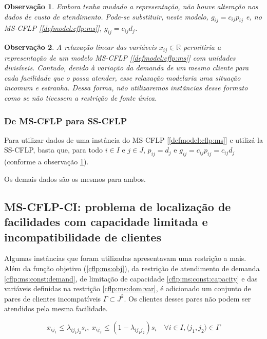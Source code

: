 \documentclass[]{article}
\newtheorem{observation}{Observação}
\begin{document}
 			\begin{observation} \label{cflp:ss:obs:gc} 
 				Embora tenha mudado a representação, não houve alteração nos dados de custo de atendimento. 
 				Pode-se substituir, neste modelo, $g_{ij} = c_{ij} p_{ij}$ e, no MS-CFLP [\ref{defmodel:cflp:ms}], $g_{ij} = c_{ij} d_j$.
 			\end{observation}
 		
 			\begin{observation} \label{cflp:ss:obs:ms}
 				A relaxação linear das variáveis $x_{ij} \in \mathbb{R}$ permitiria a representação de um modelo MS-CFLP [\ref{defmodel:cflp:ms}] com unidades divisíveis.  
 				Contudo, devido à variação da demanda de um mesmo cliente para cada facilidade que o possa atender, esse relaxação modelaria uma situação incomum e estranha. Dessa forma, não utilizaremos instâncias desse formato como se não tivessem a restrição de fonte única.
	 		\end{observation}	
 		
 			\subsubsection{De MS-CFLP para SS-CFLP} \label{defmodel:cflp:ms:ss}
 				Para utilizar dados de uma instância do MS-CFLP [\ref{defmodel:cflp:ms}] e utilizá-la SS-CFLP, basta que, para todo $i \in I$ e $j \in J$, $p_{ij} = d_j$ e $g_{ij} = c_{ij} p_{ij} = c_{ij} d_j$ (conforme a observação \ref{cflp:ss:obs:gc}).
 				
 				Os demais dados são os mesmos para ambos. 
 				
 			    
 				
 		\subsection{MS-CFLP-CI: problema de localização de facilidades com capacidade limitada e incompatibilidade de clientes} \label{defmodel:cflp:ci}	
 		
 			Algumas instâncias que foram utilizadas apresentavam uma restrição a mais.
 			Além da função objetivo (\ref{cflp:ms:obj}), da restrição de atendimento de demanda \ref{cflp:ms:const:demand}, de limitação de capacidade \ref{cflp:ms:const:capacity} e das variáveis definidas na restrição \ref{cflp:ms:dom:var}, é adicionado um conjunto de pares de clientes incompatíveis $\Gamma \subset J^2$. 
 			Os clientes desses pares não podem ser atendidos pela mesma facilidade.
 			
 			\begin{equation}
 				\label{cflp:ms:ci:const:incomp}		
 					x_{ij_1} \le \lambda_{ij_1j_2} s_i, 
 					\ x_{ij_2} \le (1 - \lambda_{ij_1j_2}) s_i 
 					\quad
 					\forall i \in I, \langle j_1, j_2 \rangle \in \Gamma  				
 			\end{equation} 
 		
\end{document}
